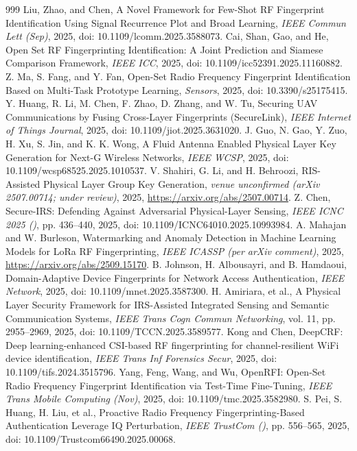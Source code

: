 \documentclass[10.5pt,compsoc,winfonts]{ICN}
\begin{document}
\begin{thebibliography}{999}
Liu, Zhao, and Chen, A Novel Framework for Few-Shot RF Fingerprint Identification Using Signal Recurrence Plot and Broad Learning, \emph{IEEE Commun Lett (Sep)}, 2025, doi: 10.1109/lcomm.2025.3588073.
Cai, Shan, Gao, and He, Open Set RF Fingerprinting Identification: A Joint Prediction and Siamese Comparison Framework, \emph{IEEE ICC}, 2025, doi: 10.1109/icc52391.2025.11160882.
Z. Ma, S. Fang, and Y. Fan, Open-Set Radio Frequency Fingerprint Identification Based on Multi-Task Prototype Learning, \emph{Sensors}, 2025, doi: 10.3390/s25175415.
Y. Huang, R. Li, M. Chen, F. Zhao, D. Zhang, and W. Tu, Securing UAV Communications by Fusing Cross-Layer Fingerprints (SecureLink), \emph{IEEE Internet of Things Journal}, 2025, doi: 10.1109/jiot.2025.3631020.
J. Guo, N. Gao, Y. Zuo, H. Xu, S. Jin, and K. K. Wong, A Fluid Antenna Enabled Physical Layer Key Generation for Next-G Wireless Networks, \emph{IEEE WCSP}, 2025, doi: 10.1109/wcsp68525.2025.1010537.
V. Shahiri, G. Li, and H. Behroozi, RIS-Assisted Physical Layer Group Key Generation, \emph{venue unconfirmed (arXiv 2507.00714; under review)}, 2025, \url{https://arxiv.org/abs/2507.00714}.
Z. Chen, Secure-IRS: Defending Against Adversarial Physical-Layer Sensing, \emph{IEEE ICNC 2025 ()}, pp. 436–440, 2025, doi: 10.1109/ICNC64010.2025.10993984.
A. Mahajan and W. Burleson, Watermarking and Anomaly Detection in Machine Learning Models for LoRa RF Fingerprinting, \emph{IEEE ICASSP (per arXiv comment)}, 2025, \url{https://arxiv.org/abs/2509.15170}.
B. Johnson, H. Albousayri, and B. Hamdaoui, Domain-Adaptive Device Fingerprints for Network Access Authentication, \emph{IEEE Network}, 2025, doi: 10.1109/mnet.2025.3587300.
H. Amiriara, et al., A Physical Layer Security Framework for IRS-Assisted Integrated Sensing and Semantic Communication Systems, \emph{IEEE Trans Cogn Commun Networking}, vol. 11, pp. 2955–2969, 2025, doi: 10.1109/TCCN.2025.3589577.
Kong and Chen, DeepCRF: Deep learning-enhanced CSI-based RF fingerprinting for channel-resilient WiFi device identification, \emph{IEEE Trans Inf Forensics Secur}, 2025, doi: 10.1109/tifs.2024.3515796.
Yang, Feng, Wang, and Wu, OpenRFI: Open-Set Radio Frequency Fingerprint Identification via Test-Time Fine-Tuning, \emph{IEEE Trans Mobile Computing (Nov)}, 2025, doi: 10.1109/tmc.2025.3582980.
S. Pei, S. Huang, H. Liu, et al., Proactive Radio Frequency Fingerprinting-Based Authentication Leverage IQ Perturbation, \emph{IEEE TrustCom ()}, pp. 556–565, 2025, doi: 10.1109/Trustcom66490.2025.00068.

\end{thebibliography}
\end{document}
